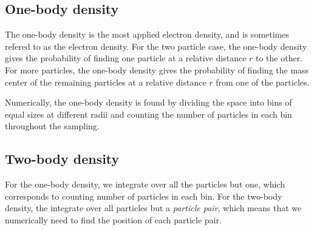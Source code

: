 \subsection{One-body density}
The one-body density is the most applied electron density, and is sometimes refered to as the electron density. For the two particle case, the one-body density gives the probability of finding one particle at a relative distance $r$ to the other. For more particles, the one-body density gives the probability of finding the mass center of the remaining particles at a relative distance $r$ from one of the particles.

Numerically, the one-body density is found by dividing the space into bins of equal sizes at different radii and counting the number of particles in each bin throughout the sampling. 



\subsection{Two-body density}
For the one-body density, we integrate over all the particles but one, which corresponds to counting number of particles in each bin. For the two-body density, the integrate over all particles but a \textit{particle pair}, which means that we numerically need to find the position of each particle pair. 




